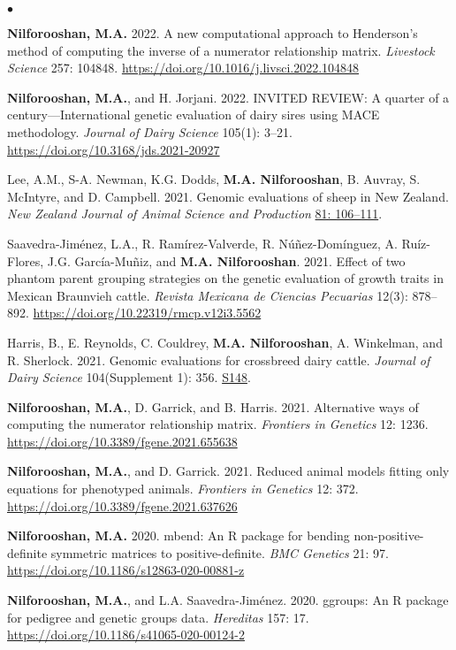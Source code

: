 \documentclass[margin,line]{res}
\newenvironment{list2}{
  \begin{list}{$\bullet$}{%
      \setlength{\itemsep}{0in}
      \setlength{\parsep}{0in} \setlength{\parskip}{0in}
      \setlength{\topsep}{0in} \setlength{\partopsep}{0in}
      \setlength{\leftmargin}{0.2in}}}{\end{list}}
\begin{document}
\begin{resume}
\begin{list2}
    \item {\bf Nilforooshan, M.A.} 2022. A new computational approach to Henderson's method of computing the inverse of a numerator relationship matrix. {\em Livestock Science} 257: 104848. \url{https://doi.org/10.1016/j.livsci.2022.104848}
    \item {\bf Nilforooshan, M.A.}, and H. Jorjani. 2022. INVITED REVIEW: A quarter of a century---International genetic evaluation of dairy sires using MACE methodology. {\em Journal of Dairy Science} 105(1): 3--21. \url{https://doi.org/10.3168/jds.2021-20927}
    \item Lee, A.M., S-A. Newman, K.G. Dodds, {\bf M.A. Nilforooshan}, B. Auvray, S. McIntyre, and D. Campbell. 2021. Genomic evaluations of sheep in New Zealand. {\em New Zealand Journal of Animal Science and Production} \href{http://www.nzsap.org/proceedings/genomic-evaluations-sheep-new-zealand}{81: 106--111}.
    \item Saavedra-Jim\'{e}nez, L.A., R. Ram\'{i}rez-Valverde, R. N\'{u}\~{n}ez-Dom\'{i}nguez, A. Ru\'{i}z-Flores, J.G. Garc\'{i}a-Mu\~{n}iz, and {\bf M.A. Nilforooshan}. 2021. Effect of two phantom parent grouping strategies on the genetic evaluation of growth traits in Mexican Braunvieh cattle. {\em Revista Mexicana de Ciencias Pecuarias} 12(3): 878--892. \url{https://doi.org/10.22319/rmcp.v12i3.5562}
    \item Harris, B., E. Reynolds, C. Couldrey, {\bf M.A. Nilforooshan}, A. Winkelman, and R. Sherlock. 2021. Genomic evaluations for crossbreed dairy cattle. {\em Journal of Dairy Science} 104(Supplement 1): 356. \href{https://www.adsa.org/Portals/0/SiteContent/Docs/Meetings/2021ADSA/ADSA2021_Abstracts.pdf}{S148}.
    \item {\bf Nilforooshan, M.A.}, D. Garrick, and B. Harris. 2021. Alternative ways of computing the numerator relationship matrix. {\em Frontiers in Genetics} 12: 1236. \url{https://doi.org/10.3389/fgene.2021.655638}
    \item {\bf Nilforooshan, M.A.}, and D. Garrick. 2021. Reduced animal models fitting only equations for phenotyped animals. {\em Frontiers in Genetics} 12: 372. \url{https://doi.org/10.3389/fgene.2021.637626}
    \item {\bf Nilforooshan, M.A.} 2020. mbend: An R package for bending non-positive-deﬁnite symmetric matrices to positive-deﬁnite. {\em BMC Genetics} 21: 97. \url{https://doi.org/10.1186/s12863-020-00881-z}
    \item {\bf Nilforooshan, M.A.}, and L.A. Saavedra-Jim\'{e}nez. 2020. ggroups: An R package for pedigree and genetic groups data. {\em Hereditas} 157: 17. \url{https://doi.org/10.1186/s41065-020-00124-2}

\end{list2}
\end{resume}
\end{document}

